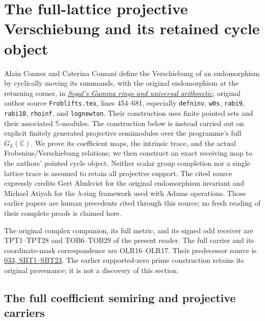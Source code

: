 \section{The full-lattice projective Verschiebung and its retained cycle object}
\label{sec:full-lattice-witt-receiver}

Alain Connes and Caterina Consani define the Verschiebung of an
endomorphism by cyclically moving its summands, with the original
endomorphism at the returning corner, in
\href{https://arxiv.org/abs/2004.08879v1}{\emph{Segal's Gamma rings
and universal arithmetic}}, original author source
\nolinkurl{Froblifts.tex}, lines 454--681, especially
\texttt{defninv}, \texttt{w0s}, \texttt{rabi9}, \texttt{rabi10},
\texttt{rhoinf}, and \texttt{lognewton}.
Their construction uses finite pointed sets and their associated
$\mathbb S$-modules. The construction below is instead carried out
on explicit finitely generated projective semimodules over the
programme's full $G_L(\mathbb C)$. We prove its coefficient maps,
the intrinsic trace, and the actual Frobenius/Verschiebung relations;
we then construct an exact receiving map to the authors' pointed
cycle object. Neither scalar group completion nor a single lattice
trace is assumed to retain all projective support.
The cited source expressly credits Gert Almkvist for the original
endomorphism invariant and Michael Atiyah for the $\lambda$-ring
framework used with Adams operations. Those earlier papers are
human precedents cited through this source; no fresh reading of
their complete proofs is claimed here.

The original complex companion, its full metric, and its signed
odd receiver are TPT1--TPT28 and TOB6--TOB29 of the present reader.
The full carrier and its coordinate-mask correspondence are
OLR16--OLR17. Their predecessor source is
\href{https://github.com/KokunoYumeto/zeta-function-research-reader/blob/3c78cfbd9e194d35117b33277c421c6564ce3dbf/workbenches/splitzero-tandem/continuations/20260923-full-prime-support/033/MIXED_PRIME_ENERGY_AND_BOUNDARY.tex}{033,
SBT1--SBT23}. The earlier supported-zero prime construction retains
its original provenance; it is not a discovery of this section.

\subsection{The full coefficient semiring and projective carriers}

